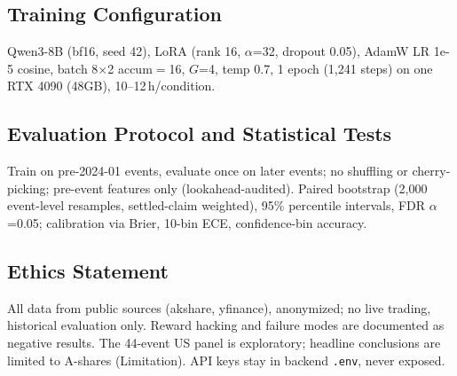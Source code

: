 \documentclass[sigconf, anonymous, review]{acmart}
\begin{document}
\subsection{Training Configuration}

Qwen3-8B (bf16, seed 42), LoRA (rank 16, $\alpha$=32, dropout 0.05), AdamW LR 1e-5 cosine, batch 8$\times$2 accum$=$16, $G$=4, temp 0.7, 1 epoch (1,241 steps) on one RTX 4090 (48GB), 10--12\,h/condition.

\subsection{Evaluation Protocol and Statistical Tests}

Train on pre-2024-01 events, evaluate once on later events; no shuffling or cherry-picking; pre-event features only (lookahead-audited). Paired bootstrap (2,000 event-level resamples, settled-claim weighted), 95\% percentile intervals, FDR $\alpha$=0.05; calibration via Brier, 10-bin ECE, confidence-bin accuracy.

\subsection{Ethics Statement}

All data from public sources (akshare, yfinance), anonymized; no live trading, historical evaluation only. Reward hacking and failure modes are documented as negative results. The 44-event US panel is exploratory; headline conclusions are limited to A-shares (Limitation). API keys stay in backend \texttt{.env}, never exposed.
\end{document}
